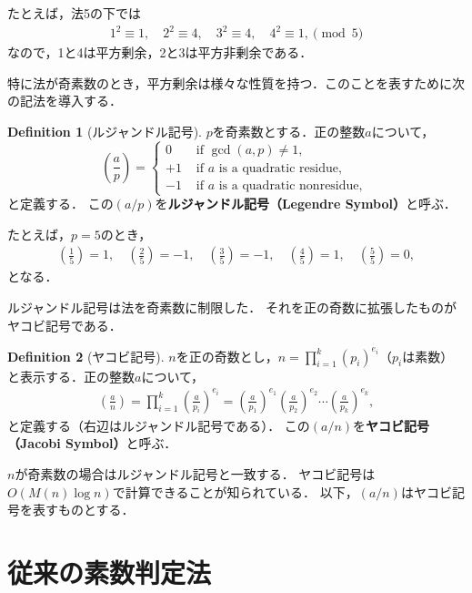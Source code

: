 \documentclass[uplatex]{jsarticle}
\theoremstyle{definition}
\newtheorem{dfn}{Definition}[section]
\begin{document}
たとえば，法5の下では
\begin{align*}
    1^2\equiv1, \quad 2^2\equiv4, \quad 3^2\equiv4, \quad 4^2\equiv1, \pmod{5}
\end{align*}
なので，1と4は平方剰余，2と3は平方非剰余である．

特に法が奇素数のとき，平方剰余は様々な性質を持つ．このことを表すために次の記法を導入する．

\begin{dfn}[ルジャンドル記号]
    $p$を奇素数とする．正の整数$a$について，
    \begin{equation}
        \left(\frac{a}{p}\right)= \begin{cases}0 & \text { if } \operatorname{gcd}(a, p) \neq 1, \\ +1 & \text { if } a \text { is a quadratic residue,} \\ -1 & \text { if } a \text { is a quadratic nonresidue, }\end{cases}
    \end{equation}
    と定義する．
    この$(a/p)$を\textbf{ルジャンドル記号（Legendre Symbol）}と呼ぶ．
\end{dfn}

たとえば，$p=5$のとき，
\begin{align*}
    \left(\frac{1}{5}\right)=1, \quad\left(\frac{2}{5}\right)=-1, \quad\left(\frac{3}{5}\right)=-1, \quad\left(\frac{4}{5}\right)=1, \quad\left(\frac{5}{5}\right)=0,
\end{align*}
となる．

ルジャンドル記号は法を奇素数に制限した．
それを正の奇数に拡張したものがヤコビ記号である．

\begin{dfn}[ヤコビ記号]
    $n$を正の奇数とし，$n = \prod_{i=1}^{k} (p_i)^{e_i}$（$p_i$は素数）と表示する．正の整数$a$について，
    \begin{align}
        \left(\frac{a}{n}\right)=\prod_{i=1}^k\left(\frac{a}{p_i}\right)^{e_i}=\left(\frac{a}{p_1}\right)^{e_1}\left(\frac{a}{p_2}\right)^{e_2}\cdots\left(\frac{a}{p_k}\right)^{e_k},
    \end{align}
    と定義する（右辺はルジャンドル記号である）．
    この$(a/n)$を\textbf{ヤコビ記号（Jacobi Symbol）}と呼ぶ．
\end{dfn}

$n$が奇素数の場合はルジャンドル記号と一致する．
ヤコビ記号は$O(M(n)\log n)$で計算できることが知られている\cite{brent2010m}．
以下，$(a/n)$はヤコビ記号を表すものとする．

\section{従来の素数判定法}
\end{document}
